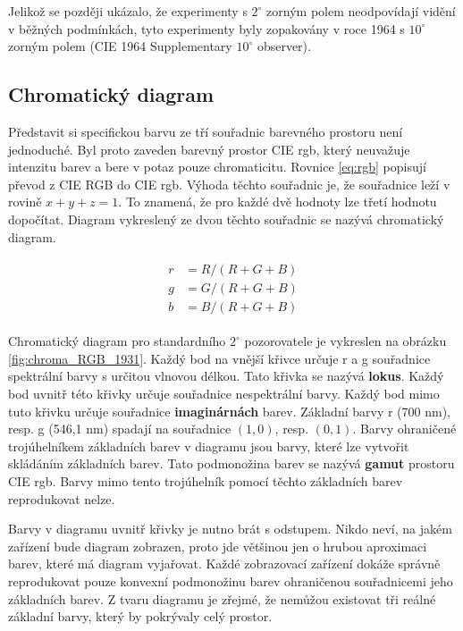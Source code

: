 \documentclass[a4paper, 12pt, titlepage]{article}
\begin{document}
  Jelikož se později ukázalo, že experimenty s $2^\circ$ zorným polem neodpovídají vidění v běžných podmínkách, tyto experimenty byly zopakovány v roce 1964 s $10^\circ$ zorným polem (CIE 1964 Supplementary $10^\circ$ observer).

  \subsection{Chromatický diagram}

  Představit si specifickou barvu ze tří souřadnic barevného prostoru není jednoduché.
  Byl proto zaveden barevný prostor CIE rgb, který neuvažuje intenzitu barev a bere v potaz pouze chromaticitu.
  Rovnice \ref{eq:rgb} popisují převod z CIE RGB do CIE rgb.
  Výhoda těchto souřadnic je, že souřadnice leží v rovině $x + y + z = 1$.
  To znamená, že pro každé dvě hodnoty lze třetí hodnotu dopočítat.
  Diagram vykreslený ze dvou těchto souřadnic se nazývá chromatický diagram.

  \begin{align}
    \begin{split}
    r &= R / (R + G + B)\\
    g &= G / (R + G + B)\\
    b &= B / (R + G + B)
  \end{split}
    \label{eq:rgb}
  \end{align}

  Chromatický diagram pro standardního $2^\circ$ pozorovatele je vykreslen na obrázku \ref{fig:chroma_RGB_1931}.
  Každý bod na vnější křivce určuje r a g souřadnice spektrální barvy s určitou vlnovou délkou.
  Tato křivka se nazývá \textbf{lokus}.
  Každý bod uvnitř této křivky určuje souřadnice nespektrální barvy.
  Každý bod mimo tuto křivku určuje souřadnice \textbf{imaginárnách} barev.
  Základní barvy r (700 nm), resp. g (546,1 nm) spadají na souřadnice $(1, 0)$, resp. $(0, 1)$.
  Barvy ohraničené trojúhelníkem základních barev v diagramu jsou barvy, které lze vytvořit skládáním základních barev. Tato podmonožina barev se nazývá \textbf{gamut} prostoru CIE rgb.
  Barvy mimo tento trojúhelník pomocí těchto základních barev reprodukovat nelze. \cite{Abraham2016, Walker1996, ciexyz}

  Barvy v diagramu uvnitř křivky je nutno brát s odstupem.
  Nikdo neví, na jakém zařízení bude diagram zobrazen, proto jde většinou jen o hrubou aproximaci barev, které má diagram vyjařovat.
  Každé zobrazovací zařízení dokáže správně reprodukovat pouze konvexní podmonožinu barev ohraničenou souřadnicemi jeho základních barev.
  Z tvaru diagramu je zřejmé, že nemůžou existovat tři reálné základní barvy, který by pokrývaly celý prostor.
\end{document}
